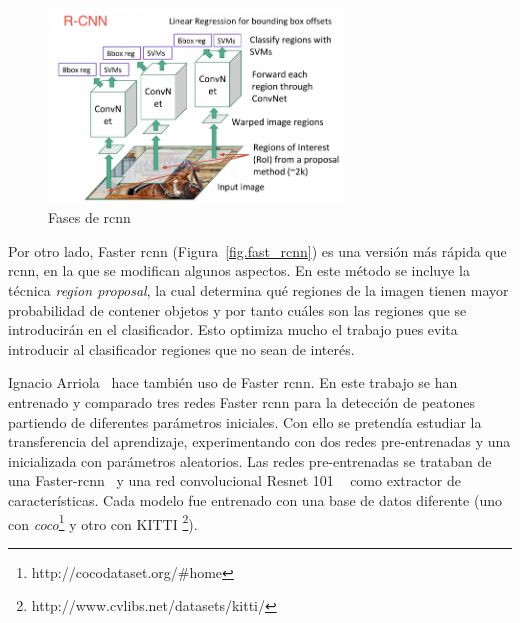 \begin{figure}[H]
  \begin{center}
    \includegraphics[width=0.7\textwidth]{figures/estado_arte/rcnn.png}
		\caption{Fases de \acrshort{rcnn}}
		\label{fig.rcnn}
		\end{center}
\end{figure}

Por otro lado, Faster \acrshort{rcnn} (Figura~\ref{fig.fast_rcnn}) es una versión más rápida que \acrshort{rcnn}, en la que se modifican algunos aspectos. En este método se incluye la técnica \textit{region proposal}, la cual determina qué regiones de la imagen tienen mayor probabilidad de contener objetos y por tanto cuáles son las regiones que se introducirán en el clasificador. Esto optimiza mucho el trabajo pues evita introducir al clasificador regiones que no sean de interés.


Ignacio Arriola~\cite{tesis_ignacio_arriola} hace también uso de Faster \acrshort{rcnn}. En este trabajo se han entrenado y comparado tres redes Faster \acrshort{rcnn} para la detección de peatones partiendo de diferentes parámetros iniciales. Con ello se pretendía estudiar la transferencia del aprendizaje, experimentando con dos redes pre-entrenadas y una inicializada con parámetros aleatorios.  Las redes pre-entrenadas se trataban de una Faster-\acrshort{rcnn}~\cite{faster_rcnn_ignacio} y una red convolucional Resnet 101 ~\cite{faster_rcnn_regnet_ignacio} como extractor de características. Cada modelo fue entrenado con una base de datos diferente (uno con \textit{\acrfull{coco}}\footnote{http://cocodataset.org/\#home} y otro con KITTI \footnote{http://www.cvlibs.net/datasets/kitti/}).

